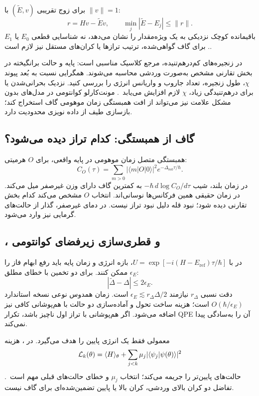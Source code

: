 برای زوج تقریبی $(\widetilde E,v)$ با $\|v\|=1$:
\begin{equation}
	r=Hv-\widetilde Ev,\qquad
	\min_j|\widetilde E-E_j|\leq\|r\|.
\end{equation}
باقیمانده کوچک نزدیکی به یک ویژه‌مقدار را نشان می‌دهد، نه شناسایی قطعی $E_0$ یا $E_1$.
برای گاف گواهی‌شده، ترتیب ترازها یا کران‌های مستقل نیز لازم است.

در زنجیره‌های کم‌درهم‌تنیده،  مرجع کلاسیک مناسبی است: پایه و حالت برانگیخته در بخش تقارنی مشخص به‌صورت وردشی محاسبه می‌شوند.
همگرایی نسبت به بُعد پیوند $\chi$، طول زنجیره، تعداد جاروب و واریانس انرژی را بررسی کنید.
نزدیک بحرانی‌شدن یا برای درهم‌تنیدگی زیاد، $\chi$ لازم افزایش می‌یابد~\cite{GapSchollwock2011}.
مونت‌کارلو کوانتومی در مدل‌های بدون مشکل علامت نیز می‌تواند از افت همبستگی زمان موهومی گاف استخراج کند؛ بازسازی طیف از داده نویزی محدودیت دارد.

\subsection{گاف از همبستگی: کدام تراز دیده می‌شود؟}
همبستگی متصل زمان موهومی در پایه واقعی، برای $O$ هرمیتی:
\begin{equation}
	C_O(\tau)=\sum_{m>0}|\langle m|O|0\rangle|^2e^{-\Delta_{m0}\tau/\hbar}.
\end{equation}
در زمان بلند، شیب $-\hbar\,d\log C_O/d\tau$ به کمترین گاف دارای وزن غیرصفر میل می‌کند.
در زمان حقیقی همین فرکانس‌ها نوسانی‌اند. انتخاب $O$ مشخص می‌کند کدام بخش تقارنی دیده شود؛ نبود قله دلیل نبود تراز نیست.
در دمای غیرصفر، گذار از حالت‌های گرمایی نیز وارد می‌شود.

\subsection{،  و قطری‌سازی زیرفضای کوانتومی}
در  با $U=\exp[-i(H-E_{\mathrm{ref}})\tau/\hbar]$، بازه انرژی و زمان پایه باید رفع ابهام فاز را ممکن کنند.
برای دو تخمین با خطای مطلق $\epsilon_E$:
\begin{equation}
	|\widetilde\Delta-\Delta|\leq2\epsilon_E.
\end{equation}
دقت نسبی $r_\Delta$ نیازمند $\epsilon_E\lesssim r_\Delta\Delta/2$ است.
زمان همدوس نوعی نسخه استاندارد $O(\hbar/\epsilon_E)$ است؛ هزینه ساخت تحول و آماده‌سازی دو حالت با هم‌پوشانی کافی نیز اضافه می‌شود.
اگر هم‌پوشانی با تراز اول ناچیز باشد، تکرار QPE آن را به‌سادگی پیدا نمی‌کند.

 معمولی فقط یک انرژی پایین را هدف می‌گیرد. در ، هزینه
\begin{equation}
	{\cal L}_k(\theta)=\langle H\rangle_\theta+
	\sum_{j<k}\mu_j|\langle\psi_j|\psi(\theta)\rangle|^2
\end{equation}
حالت‌های پایین‌تر را جریمه می‌کند؛ انتخاب $\mu_j$ و خطای حالت‌های قبلی مهم است~\cite{GapHiggott2019}.
تفاضل دو کران بالای وردشی، کران بالا یا پایین تضمین‌شده‌ای برای گاف نیست.


